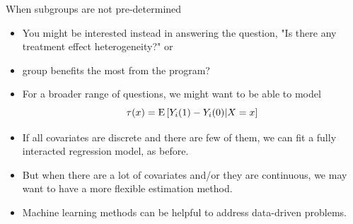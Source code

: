 \documentclass[xcolor={dvipsnames},handout]{beamer}
\begin{document}

\begin{frame}{When subgroups are not pre-determined}

\begin{itemize}
\item You might be interested instead in answering the question, "Is there any treatment effect heterogeneity?"  or
\item \text{Which} group benefits the most from the program?
\end{itemize}

\end{frame}



\begin{frame}%

\begin{itemize}
\item For a broader range of questions, we might want to be able to model
\[
\tau(x) = {\textrm E}\, [Y_i(1) - Y_i(0) | X = x]
\]

\item If all covariates are discrete and there are few of them, we can fit a fully interacted regression model, as before.
\item But when there are a lot of covariates and/or they are continuous, we may want to have a more flexible estimation method.
\item Machine learning methods can be helpful to address data-driven problems.
\end{itemize}

\end{frame}


\end{document}
